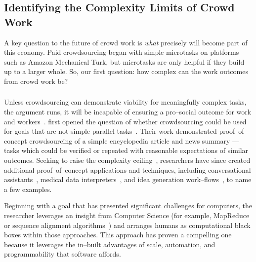 \documentclass[trackingWork]{subfiles}
\begin{document}
\begin{comment}
Crowdwork
  - Kittur said let's do complex stuff
  - This works by using CS techniques
  - Clear that this works in focused cases
  - More recent shift toward using experts
\end{comment}

\subsection[What are the complexity limits of crowd work]
{Identifying the Complexity Limits of Crowd Work}\label{sec:complexity}
A key question to the future of crowd work is
\textit{what} precisely will become part of this economy.
Paid crowdsourcing began with simple microtasks on platforms such as
Amazon Mechanical Turk, but
microtasks are only helpful if they build up to a larger whole.
So, our first question:
how complex can the work outcomes from crowd work be?

\subsubsection{\crowdworkpers}

Unless crowdsourcing can demonstrate viability for meaningfully complex tasks,
the argument runs,
it will be incapable of ensuring a pro--social outcome for work and workers~\cite{crowdworkFuture}.
\citeauthor{crowdForgeKittur} first opened the question of
whether crowdsourcing could be used for goals that are not simple parallel tasks~\cite{crowdForgeKittur}.
Their work demonstrated proof--of--concept crowdsourcing of
a simple encyclopedia article and news summary
--- tasks which could be verified or repeated
with reasonable expectations of similar outcomes.
Seeking to raise the complexity ceiling~\cite{myers2000past},
researchers have since created
additional proof--of--concept applications and techniques,
including conversational assistants~\cite{lasecki2013chorus},
medical data interpreters~\cite{lasecki2013chorus}, and
idea generation work--flows~\cite{YuEncouragingOutside,yu2014distributed,Yu2016a},
to name a few examples.

Beginning with a goal that has
presented significant challenges for computers,
the researcher leverages an insight from Computer Science
(for example, MapReduce~\cite{crowdForgeKittur} or
sequence alignment algorithms~\cite{lasecki2012real})
and arranges humans as computational black boxes within those approaches.
This approach has proven a compelling one because
it leverages the in--built advantages of
scale,
automation, and
programmability that software affords.
\end{document}
